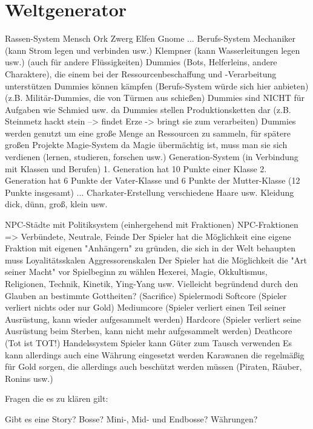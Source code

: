 \section{Weltgenerator}
\label{sec:weltgenerator}


    Rassen-System
        Mensch
        Ork
        Zwerg
        Elfen
        Gnome
        ...
    Berufs-System
        Mechaniker (kann Strom legen und verbinden usw.)
        Klempner (kann Wasserleitungen legen usw.) (auch für andere Flüssigkeiten)
    Dummies (Bots, Helferleins, andere Charaktere), die einem bei der Ressourcenbeschaffung und -Verarbeitung unterstützen
        Dummies können kämpfen (Berufs-System würde sich hier anbieten) (z.B. Militär-Dummies, die von Türmen aus schießen)
        Dummies sind NICHT für Aufgaben wie Schmied usw. da
        Dummies stellen Produktionsketten dar (z.B. Steinmetz hackt stein --> findet Erze -> bringt sie zum verarbeiten)
        Dummies werden genutzt um eine große Menge an Ressourcen zu sammeln, für spätere großen Projekte
    Magie-System
        da Magie übermächtig ist, muss man sie sich verdienen (lernen, studieren, forschen usw.)
    Generation-System (in Verbindung mit Klassen und Berufen)
        1. Generation hat 10 Punkte einer Klasse
        2. Generation hat 6 Punkte der Vater-Klasse und 6 Punkte der Mutter-Klasse (12 Punkte insgesamt)
        ...
    Charkater-Erstellung
        verschiedene Haare usw.
        Kleidung
        dick, dünn, groß, klein usw.

    NPC-Städte mit Politiksystem (einhergehend mit Fraktionen)
    NPC-Fraktionen => Verbündete, Neutrale, Feinde
    Der Spieler hat die Möglichkeit eine eigene Fraktion mit eigenen "Anhängern" zu gründen, die sich in der Welt behaupten muss
        Loyalitätsskalen
        Aggressorenskalen
    Der Spieler hat die Möglichkeit die "Art seiner Macht" vor Spielbeginn zu wählen
        Hexerei, Magie, Okkultismus, Religionen, Technik, Kinetik, Ying-Yang usw.
        Vielleicht begründend durch den Glauben an bestimmte Gottheiten? (Sacrifice)
    Spielermodi
        Softcore (Spieler verliert nichts oder nur Gold)
        Mediumcore (Spieler verliert einen Teil seiner Ausrüstung, kann wieder aufgesammelt werden)
        Hardcore (Spieler verliert seine Ausrüstung beim Sterben, kann nicht mehr aufgesammelt werden)
        Deathcore (Tot ist TOT!)
    Handelssystem
        Spieler kann Güter zum Tausch verwenden
        Es kann allerdings auch eine Währung eingesetzt werden
        Karawanen die regelmäßig für Gold sorgen, die allerdings auch beschützt werden müssen (Piraten, Räuber, Ronins usw.)

Fragen die es zu klären gilt:

    Gibt es eine Story?
    Bosse? Mini-, Mid- und Endbosse?
    Währungen?